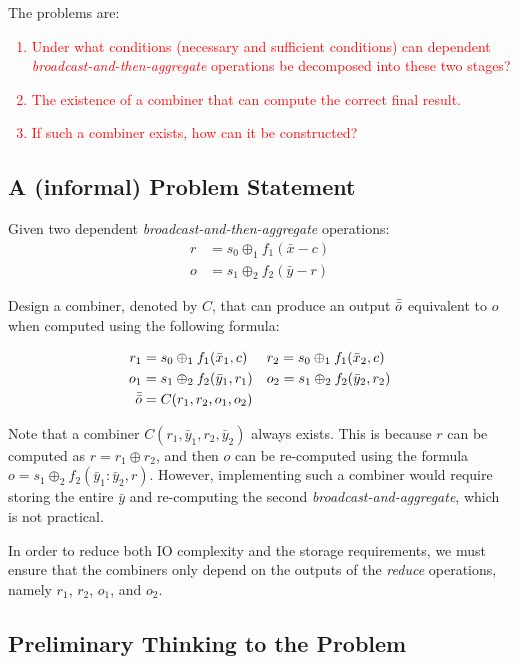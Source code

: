 The problems are:
\textcolor{red}{
\begin{enumerate}
    \item Under what conditions (necessary and sufficient conditions) can dependent \textit{broadcast-and-then-aggregate} operations be decomposed into these two stages?
    \item The existence of a combiner that can compute the correct final result.
    \item If such a combiner exists, how can it be constructed?
\end{enumerate}
}

\subsection{A (informal) Problem Statement}

Given two dependent \textit{broadcast-and-then-aggregate} operations:
\begin{align*}
    r &= s_0 \oplus_1 f_1(\bar{x} - c) \\
    o &= s_1 \oplus_2 f_2(\bar{y} - r)
\end{align*}

Design a combiner, denoted by $C$, that can produce an output $\Bar{\Bar{o}}$ equivalent to $o$ when computed using the following formula:
    
\begin{align*}
    r_1 &= s_0 \oplus_1 f_1(\bar{x}_1,c) && r_2 = s_0 \oplus_1 f_1(\bar{x}_2,c) \\
    o_1 &= s_1 \oplus_2 f_2(\bar{y}_1,r_1) && o_2 = s_1 \oplus_2 f_2(\bar{y}_2,r_2) \\
    \Bar{\Bar{o}} &= C(r_1, r_2, o_1, o_2)
\end{align*}

Note that a combiner $C(r_1, \bar{y}_1, r_2, \bar{y}_2)$ always exists.
This is because $r$ can be computed as $r = r_1 \oplus r_2$, and then $o$ can be re-computed using the formula $o = s_1 \oplus_2 f_2(\bar{y}_1:\bar{y}_2, r)$. 
However, implementing such a combiner would require storing the entire $\bar{y}$ and re-computing the second \textit{broadcast-and-aggregate},
which is not practical.

In order to reduce both IO complexity and the storage requirements, we must ensure that the combiners only depend on the outputs of the \textit{reduce} operations, namely $r_1$, $r_2$, $o_1$, and $o_2$.

\subsection{Preliminary Thinking to the Problem}

